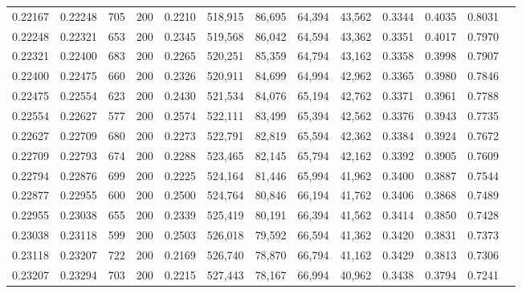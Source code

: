 \begin{tabular}{rrrrrrrrrrrrr}
0.22167 & 0.22248 &   705 & 200 &                                     0.2210 & 518,915 &  86,695 &  64,394 &  43,562 & 0.3344 & 0.4035 & 0.8031 \\
0.22248 & 0.22321 &   653 & 200 &                                     0.2345 & 519,568 &  86,042 &  64,594 &  43,362 & 0.3351 & 0.4017 & 0.7970 \\
0.22321 & 0.22400 &   683 & 200 &                                     0.2265 & 520,251 &  85,359 &  64,794 &  43,162 & 0.3358 & 0.3998 & 0.7907 \\
0.22400 & 0.22475 &   660 & 200 &                                     0.2326 & 520,911 &  84,699 &  64,994 &  42,962 & 0.3365 & 0.3980 & 0.7846 \\
0.22475 & 0.22554 &   623 & 200 &                                     0.2430 & 521,534 &  84,076 &  65,194 &  42,762 & 0.3371 & 0.3961 & 0.7788 \\
0.22554 & 0.22627 &   577 & 200 &                                     0.2574 & 522,111 &  83,499 &  65,394 &  42,562 & 0.3376 & 0.3943 & 0.7735 \\
0.22627 & 0.22709 &   680 & 200 &                                     0.2273 & 522,791 &  82,819 &  65,594 &  42,362 & 0.3384 & 0.3924 & 0.7672 \\
0.22709 & 0.22793 &   674 & 200 &                                     0.2288 & 523,465 &  82,145 &  65,794 &  42,162 & 0.3392 & 0.3905 & 0.7609 \\
0.22794 & 0.22876 &   699 & 200 &                                     0.2225 & 524,164 &  81,446 &  65,994 &  41,962 & 0.3400 & 0.3887 & 0.7544 \\
0.22877 & 0.22955 &   600 & 200 &                                     0.2500 & 524,764 &  80,846 &  66,194 &  41,762 & 0.3406 & 0.3868 & 0.7489 \\
0.22955 & 0.23038 &   655 & 200 &                                     0.2339 & 525,419 &  80,191 &  66,394 &  41,562 & 0.3414 & 0.3850 & 0.7428 \\
0.23038 & 0.23118 &   599 & 200 &                                     0.2503 & 526,018 &  79,592 &  66,594 &  41,362 & 0.3420 & 0.3831 & 0.7373 \\
0.23118 & 0.23207 &   722 & 200 &                                     0.2169 & 526,740 &  78,870 &  66,794 &  41,162 & 0.3429 & 0.3813 & 0.7306 \\
0.23207 & 0.23294 &   703 & 200 &                                     0.2215 & 527,443 &  78,167 &  66,994 &  40,962 & 0.3438 & 0.3794 & 0.7241 \\

\end{tabular}
